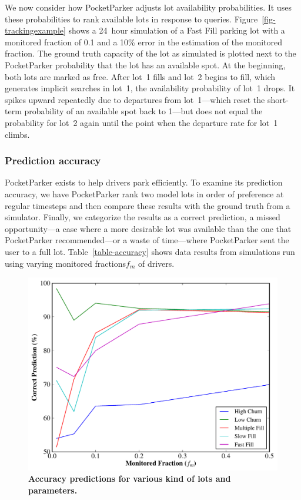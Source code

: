 We now consider how PocketParker adjusts lot availability probabilities.  It
uses these probabilities to rank available lots in response to queries.
Figure~\ref{fig-trackingexample} shows a 24~hour simulation of a Fast Fill
parking lot with a monitored fraction of 0.1 and a 10\% error in the
estimation of the monitored fraction. The ground truth capacity of the lot as
simulated is plotted next to the PocketParker probability that the lot has an
available spot. At the beginning, both lots are marked as free. After lot~1
fills and lot~2 begins to fill, which generates implicit searches
in lot~1, the availability probability of lot~1 drops. It spikes upward
repeatedly due to departures from lot~1---which reset the short-term
probability of an available spot back to 1---but does not equal the
probability for lot~2 again until the point when the departure rate for lot~1
climbs.

\subsubsection{Prediction accuracy}




PocketParker exists to help drivers park efficiently.  To examine its
prediction accuracy, we have PocketParker rank two model lots in order of
preference at regular timesteps and then compare these results with the ground
truth from a simulator.  Finally, we categorize the results as a correct
prediction, a missed opportunity---a case where a more desirable lot was
available than the one that PocketParker recommended---or a waste of
time---where PocketParker sent the user to a full lot.
Table~\ref{table-accuracy} shows data results from simulations run using
varying monitored fractions$f_m$ of drivers.

\begin{figure}[t]
\centering
\includegraphics[width=\columnwidth]{./simulator/figures/accuracy_graph.pdf}

\caption{\textbf{Accuracy predictions for various kind of lots and parameters.}}
\label{fig-accuracy}
\end{figure}

